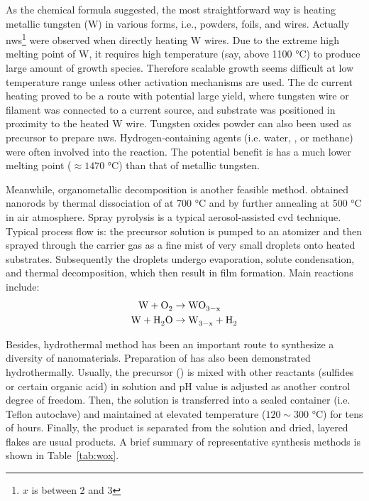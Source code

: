 As the chemical formula  suggested, the most straightforward way is heating metallic tungsten (W) in various forms,\cite{Zhou2005a,Cao2009,Hsieh2010} i.e., powders, foils, and wires. Actually  \glspl{nw}\footnote{$x$ is between 2 and 3} were observed when directly heating W wires.\cite{Gu2002a} Due to the extreme high melting point of W, it requires high temperature (say, above 1100 \si{\degreeCelsius}) to produce large amount of growth species. Therefore scalable growth seems difficult at low temperature range unless other activation mechanisms are used. The dc current heating proved to be a route with potential large yield, where tungsten wire or filament was connected to a current source, and substrate was positioned in proximity to the heated W wire.\cite{Lingfei2006,Thangala2007,Chang2007} Tungsten oxides powder can also been used as precursor to prepare  \glspl{nw}.\cite{Huang2008a,Wang2009} Hydrogen-containing agents (i.e. water, , or methane\cite{Klinke2005}) were often involved into the reaction.\cite{Baek2007,Karuppanan2007} The potential benefit is  has a much lower melting point ($\approx 1470$ \si{\degreeCelsius}) than that of metallic tungsten.

Meanwhile, organometallic decomposition is another feasible method. \citeauthor{Pol2005} obtained  nanorods by thermal dissociation of  at 700 \si{\degreeCelsius} and  by further annealing at 500 \si{\degreeCelsius} in air atmosphere.\cite{Pol2005} Spray pyrolysis is a typical aerosol-assisted \gls{cvd} technique. Typical process flow is: the precursor solution is pumped to an atomizer and then sprayed through the carrier gas as a fine mist of very small droplets onto heated substrates. Subsequently the droplets undergo evaporation, solute condensation, and thermal decomposition, which then result in film formation.\cite{Zheng2011} Main reactions include:
\begin{align}
\cee{W + O2 &\rightarrow WO_{3-x}\\
W + H2O &\rightarrow  W_{3-x} + H2}
\end{align}

Besides, hydrothermal method has been an important route to synthesize a diversity of nanomaterials. Preparation of  has also been demonstrated hydrothermally.\cite{Lee2003,Gu2007} Usually, the precursor () is mixed with other reactants (sulfides or certain organic acid) in solution and pH value is adjusted as another control degree of freedom. Then, the solution is transferred into a sealed container (i.e. Teflon autoclave) and maintained at elevated temperature ($120 \sim 300$ \si{\degreeCelsius}) for tens of hours. Finally, the product is separated from the solution and dried, layered  flakes are usual products. A brief summary of representative synthesis methods is shown in Table~\ref{tab:wox}.


